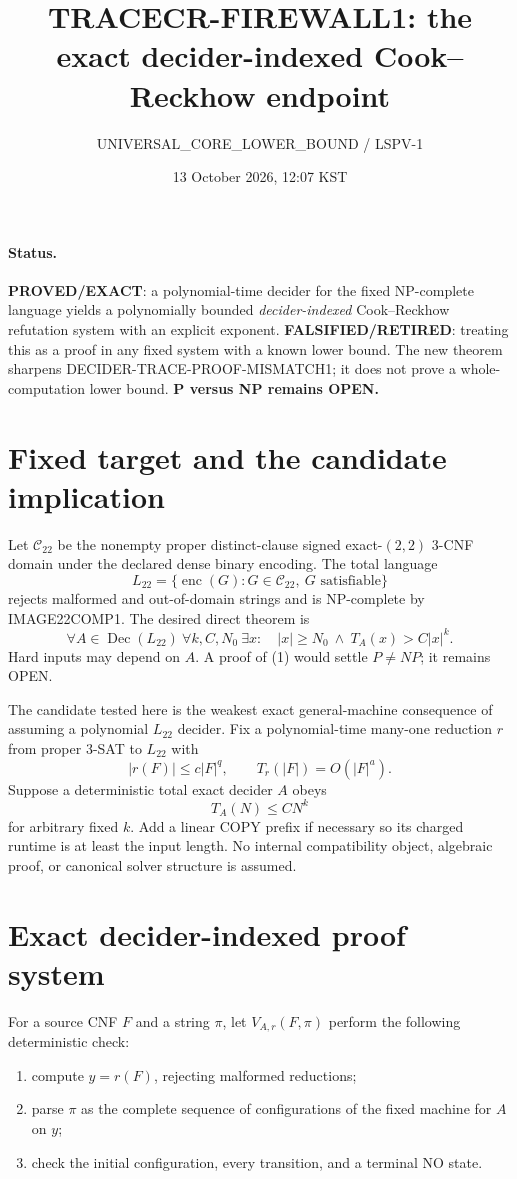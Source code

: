 \documentclass[11pt]{article}
\title{TRACECR-FIREWALL1: the exact decider-indexed Cook--Reckhow endpoint}
\author{UNIVERSAL\_CORE\_LOWER\_BOUND / LSPV-1}
\date{13 October 2026, 12:07 KST}
\newcommand{\Ltwo}{L_{22}}
\begin{document}
\maketitle

\paragraph{Status.}
\textbf{PROVED/EXACT}: a polynomial-time decider for the fixed NP-complete
language yields a polynomially bounded \emph{decider-indexed} Cook--Reckhow
refutation system with an explicit exponent.  \textbf{FALSIFIED/RETIRED}:
treating this as a proof in any fixed system with a known lower bound.
The new theorem sharpens DECIDER-TRACE-PROOF-MISMATCH1; it does not prove a
whole-computation lower bound.  \textbf{P versus NP remains OPEN.}

\section{Fixed target and the candidate implication}
Let $\mathcal C_{22}$ be the nonempty proper distinct-clause signed
exact-$(2,2)$ 3-CNF domain under the declared dense binary encoding.  The
total language
\[
 \Ltwo=\{\operatorname{enc}(G):G\in\mathcal C_{22},\ G\text{ satisfiable}\}
\]
rejects malformed and out-of-domain strings and is NP-complete by
IMAGE22COMP1.  The desired direct theorem is
\[
 \forall A\in\operatorname{Dec}(\Ltwo)\ \forall k,C,N_0\ \exists x:\quad
 |x|\ge N_0\ \land\ T_A(x)>C|x|^k.                        \tag{1}
\]
Hard inputs may depend on $A$.  A proof of (1) would settle $P\ne NP$; it
remains OPEN.

The candidate tested here is the weakest exact general-machine consequence
of assuming a polynomial $\Ltwo$ decider.  Fix a polynomial-time many-one
reduction $r$ from proper 3-SAT to $\Ltwo$ with
\[
 |r(F)|\le c|F|^q,\qquad T_r(|F|)=O(|F|^a).                \tag{2}
\]
Suppose a deterministic total exact decider $A$ obeys
\[
 T_A(N)\le C N^k                                                    \tag{3}
\]
for arbitrary fixed $k$.  Add a linear COPY prefix if necessary so its
charged runtime is at least the input length.  No internal compatibility
object, algebraic proof, or canonical solver structure is assumed.

\section{Exact decider-indexed proof system}
For a source CNF $F$ and a string $\pi$, let $V_{A,r}(F,\pi)$ perform the
following deterministic check:
\begin{enumerate}
\item compute $y=r(F)$, rejecting malformed reductions;
\item parse $\pi$ as the complete sequence of configurations of the fixed
machine for $A$ on $y$;
\item check the initial configuration, every transition, and a terminal NO
state.
\end{enumerate}
\end{document}
